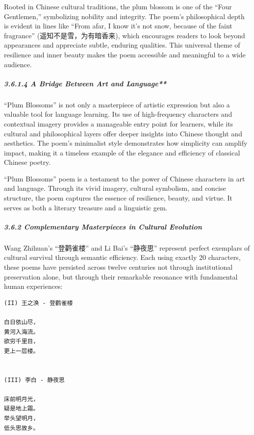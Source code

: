 \documentclass[
  11pt,
  letterpaper,
]{article}
\begin{document}
Rooted in Chinese cultural traditions, the plum blossom is one of the
``Four Gentlemen,'' symbolizing nobility and integrity. The poem's
philosophical depth is evident in lines like ``From afar, I know it's
not snow, because of the faint fragrance'' (遥知不是雪，为有暗香来),
which encourages readers to look beyond appearances and appreciate
subtle, enduring qualities. This universal theme of resilience and inner
beauty makes the poem accessible and meaningful to a wide audience.

\hypertarget{a-bridge-between-art-and-language}{%
\subparagraph{3.6.1.4 A Bridge Between Art and
Language**}\label{a-bridge-between-art-and-language}}

``Plum Blossoms'' is not only a masterpiece of artistic expression but
also a valuable tool for language learning. Its use of high-frequency
characters and contextual imagery provides a manageable entry point for
learners, while its cultural and philosophical layers offer deeper
insights into Chinese thought and aesthetics. The poem's minimalist
style demonstrates how simplicity can amplify impact, making it a
timeless example of the elegance and efficiency of classical Chinese
poetry.

``Plum Blossoms'' poem is a testament to the power of Chinese characters
in art and language. Through its vivid imagery, cultural symbolism, and
concise structure, the poem captures the essence of resilience, beauty,
and virtue. It serves as both a literary treasure and a linguistic gem.

\hypertarget{complementary-masterpieces-in-cultural-evolution}{%
\subparagraph{3.6.2 Complementary Masterpieces in Cultural
Evolution}\label{complementary-masterpieces-in-cultural-evolution}}

Wang Zhihuan's ``登鹳雀楼'' and Li Bai's ``静夜思'' represent perfect
exemplars of cultural survival through semantic efficiency. Each using
exactly 20 characters, these poems have persisted across twelve
centuries not through institutional preservation alone, but through
their remarkable resonance with fundamental human experiences:

\begin{verbatim}
(II) 王之涣 - 登鹳雀楼

白日依山尽，
黄河入海流。
欲穷千里目，
更上一层楼。


(III) 李白 - 静夜思

床前明月光，
疑是地上霜。
举头望明月，
低头思故乡。
\end{verbatim}
\end{document}
